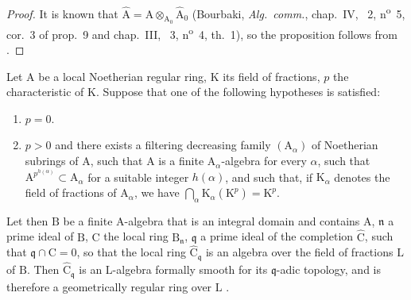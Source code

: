 \begin{proof}
It is known that $\widehat{\mathrm{A}}=\mathrm{A}\otimes_{\mathrm{A}_0}\widehat{\mathrm{A}}_0$ (Bourbaki, \emph{Alg.~comm.}, chap.~IV, \textsection~2, n\textsuperscript{o}~5, cor.~3 of prop.~9 and chap.~III, \textsection~3, n\textsuperscript{o}~4, th.~1), so the proposition follows from .
\end{proof}

\begin{proposition}[22.3.2]
\label{0.22.3.2}
Let $\mathrm{A}$ be a local Noetherian regular ring, $\mathrm{K}$ its field of fractions, $p$ the characteristic of $\mathrm{K}$.
Suppose that one of the following hypotheses is satisfied:
\begin{enumerate}
  \item[\rm{(i)}] $p=0$.
  \item[\rm{(ii)}] $p>0$ and there exists a filtering decreasing family $(\mathrm{A}_\alpha)$ of Noetherian subrings of $\mathrm{A}$, such that $\mathrm{A}$ is a finite $\mathrm{A}_\alpha$-algebra for every $\alpha$, such that $\mathrm{A}^{p^{h(\alpha)}}\subset\mathrm{A}_\alpha$ for a suitable integer $h(\alpha)$, and such that, if $\mathrm{K}_\alpha$ denotes the field of fractions of $\mathrm{A}_\alpha$, we have $\bigcap_\alpha\mathrm{K}_\alpha(\mathrm{K}^p)=\mathrm{K}^p$.
\end{enumerate}

Let then $\mathrm{B}$ be a finite $\mathrm{A}$-algebra that is an integral domain and contains $\mathrm{A}$, $\mathfrak{n}$ a prime ideal of $\mathrm{B}$, $\mathrm{C}$ the local ring $\mathrm{B}_\mathfrak{n}$, $\mathfrak{q}$ a prime ideal of the completion $\widehat{\mathrm{C}}$, such that $\mathfrak{q}\cap\mathrm{C}=0$, so that the local ring $\widehat{\mathrm{C}}_\mathfrak{q}$ is an algebra over the field of fractions $\mathrm{L}$ of $\mathrm{B}$.
Then $\widehat{\mathrm{C}}_\mathfrak{q}$ is an $\mathrm{L}$-algebra formally smooth for its $\mathfrak{q}$-adic topology, and is therefore a geometrically regular ring over $\mathrm{L}$ .
\end{proposition}

